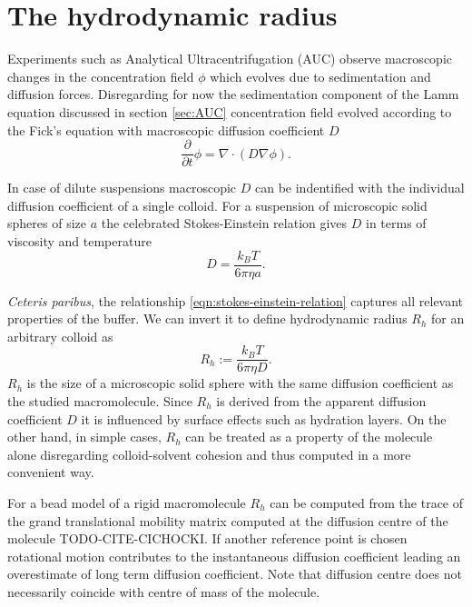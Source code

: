 \documentclass{doctoral}
\newcommand{\pd}{\partial}
\begin{document}
\section{The hydrodynamic radius}

Experiments such as Analytical Ultracentrifugation (AUC) observe macroscopic changes in the concentration field $\phi$ which evolves due to sedimentation and diffusion forces.
Disregarding for now the sedimentation component of the Lamm equation discussed in section \ref{sec:AUC} concentration field evolved according to the Fick's equation with macroscopic diffusion coefficient $D$
\begin{equation}
    \frac{\pd}{\pd t} \phi = \nabla \cdot ( D \nabla \phi ).
    \label{eqn:ficks-law}
\end{equation}

In case of dilute suspensions macroscopic $D$ can be indentified with the individual diffusion coefficient of a single colloid.
For a suspension of microscopic solid spheres of size $a$ the celebrated Stokes-Einstein relation gives $D$ in terms of viscosity and temperature
\begin{equation}
    D = \frac{k_B T}{6 \pi \eta a}.
    \label{eqn:stokes-einstein-relation}
\end{equation}

\textit{Ceteris paribus}, the relationship \eqref{eqn:stokes-einstein-relation} captures all relevant properties of the buffer.
We can invert it to define hydrodynamic radius $R_h$ for an arbitrary colloid as
\begin{equation}
    R_h :=  \frac{k_B T}{6 \pi \eta D}.
    \label{eqn:hydrodynamic-radius-definition}
\end{equation}
$R_h$ is the size of a microscopic solid sphere with the same diffusion coefficient as the studied macromolecule.
Since $R_h$ is derived from the apparent diffusion coefficient $D$ it is influenced by surface effects such as hydration layers.
On the other hand, in simple cases, $R_h$ can be treated as a property of the molecule alone disregarding colloid-solvent cohesion and thus computed in a more convenient way.

For a bead model of a rigid macromolecule $R_h$ can be computed from the trace of the grand translational mobility matrix computed at the diffusion centre of the molecule TODO-CITE-CICHOCKI.
If another reference point is chosen rotational motion contributes to the instantaneous diffusion coefficient leading an overestimate of long term diffusion coefficient.
Note that diffusion centre does not necessarily coincide with centre of mass of the molecule.
\end{document}
